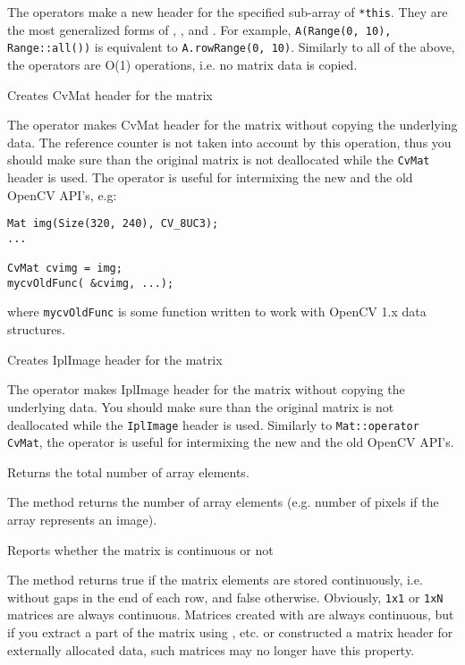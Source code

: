 The operators make a new header for the specified sub-array of \texttt{*this}. They are the most generalized forms of , ,  and . For example, \texttt{A(Range(0, 10), Range::all())} is equivalent to \texttt{A.rowRange(0, 10)}. Similarly to all of the above, the operators are O(1) operations, i.e. no matrix data is copied.

Creates CvMat header for the matrix


The operator makes CvMat header for the matrix without copying the underlying data. The reference counter is not taken into account by this operation, thus you should make sure than the original matrix is not deallocated while the \texttt{CvMat} header is used. The operator is useful for intermixing the new and the old OpenCV API's, e.g:

\begin{lstlisting}
Mat img(Size(320, 240), CV_8UC3);
...

CvMat cvimg = img;
mycvOldFunc( &cvimg, ...);
\end{lstlisting}

where \texttt{mycvOldFunc} is some function written to work with OpenCV 1.x data structures.


Creates IplImage header for the matrix


The operator makes IplImage header for the matrix without copying the underlying data. You should make sure than the original matrix is not deallocated while the \texttt{IplImage} header is used. Similarly to \texttt{Mat::operator CvMat}, the operator is useful for intermixing the new and the old OpenCV API's.

Returns the total number of array elements.


The method returns the number of array elements (e.g. number of pixels if the array represents an image).

Reports whether the matrix is continuous or not


The method returns true if the matrix elements are stored continuously, i.e. without gaps in the end of each row, and false otherwise. Obviously, \texttt{1x1} or \texttt{1xN} matrices are always continuous. Matrices created with  are always continuous, but if you extract a part of the matrix using ,  etc. or constructed a matrix header for externally allocated data, such matrices may no longer have this property.

